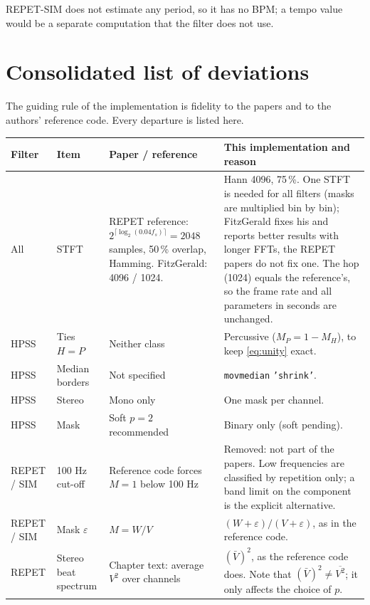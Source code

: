 \documentclass[11pt,a4paper]{article}
\newcommand{\code}[1]{\texttt{#1}}
\begin{document}
REPET-SIM does not estimate any period, so it has no BPM; a tempo value
would be a separate computation that the filter does not use.

\section{Consolidated list of deviations}
\label{sec:deviations}

The guiding rule of the implementation is fidelity to the papers and to
the authors' reference code. Every departure is listed here.

\begin{table}[htbp]
\centering
\small
\begin{tabularx}{\linewidth}{@{}p{2.1cm}p{3.6cm}LL@{}}
\toprule
Filter & Item & Paper / reference & This implementation and reason \\
\midrule
All & STFT & REPET reference: $2^{\lceil\log_2(0.04f_s)\rceil}=2048$ samples, 50\,\% overlap, Hamming. FitzGerald: 4096 / 1024. & Hann 4096, 75\,\%. One STFT is needed for all filters (masks are multiplied bin by bin); FitzGerald fixes his and reports better results with longer FFTs, the REPET papers do not fix one. The hop (1024) equals the reference's, so the frame rate and all parameters in seconds are unchanged. \\
\addlinespace
HPSS & Ties $H=P$ & Neither class & Percussive ($M_P=1-M_H$), to keep \cref{eq:unity} exact. \\
HPSS & Median borders & Not specified & \code{movmedian} \code{'shrink'}. \\
HPSS & Stereo & Mono only & One mask per channel. \\
HPSS & Mask & Soft $p=2$ recommended & Binary only (soft pending). \\
\addlinespace
REPET / SIM & 100 Hz cut-off & Reference code forces $M=1$ below 100 Hz & Removed: not part of the papers. Low frequencies are classified by repetition only; a band limit on the component is the explicit alternative. \\
REPET / SIM & Mask $\varepsilon$ & $M=W/V$ & $(W+\varepsilon)/(V+\varepsilon)$, as in the reference code. \\
\addlinespace
REPET & Stereo beat spectrum & Chapter text: average $V^2$ over channels & $(\bar V)^2$, as the reference code does. Note that $(\bar V)^2\neq\overline{V^2}$; it only affects the choice of $p$. \\

\end{tabularx}
\end{table}
\end{document}
